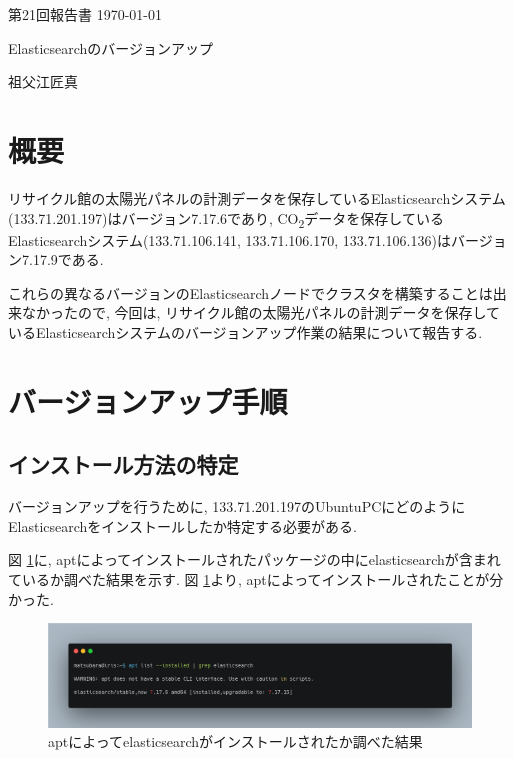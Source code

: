 \documentclass[a4j,12pt,]{jarticle}
\begin{document}
{\noindent\small 第21回報告書 \hfill\today}
\begin{center}
  {\Large Elasticsearchのバージョンアップ}
\end{center}
\begin{flushright}
  祖父江匠真 \\
\end{flushright}

\section{概要}
リサイクル館の太陽光パネルの計測データを保存しているElasticsearchシステム(133.71.201.197)はバージョン7.17.6であり, CO\textsubscript{2}データを保存しているElasticsearchシステム(133.71.106.141, 133.71.106.170, 133.71.106.136)はバージョン7.17.9である.

これらの異なるバージョンのElasticsearchノードでクラスタを構築することは出来なかったので, 今回は, リサイクル館の太陽光パネルの計測データを保存しているElasticsearchシステムのバージョンアップ作業の結果について報告する.

\section{バージョンアップ手順}

\subsection{インストール方法の特定}

バージョンアップを行うために, 133.71.201.197のUbuntuPCにどのようにElasticsearchをインストールしたか特定する必要がある.

図 \ref{p1}に, aptによってインストールされたパッケージの中にelasticsearchが含まれているか調べた結果を示す.
図 \ref{p1}より, aptによってインストールされたことが分かった.

\begin{figure}[H]
  \begin{center}
    \includegraphics[width=160mm]{apt-grep.png}
    \caption{aptによってelasticsearchがインストールされたか調べた結果}
    \label{p1}
  \end{center}
\end{figure}
\end{document}
